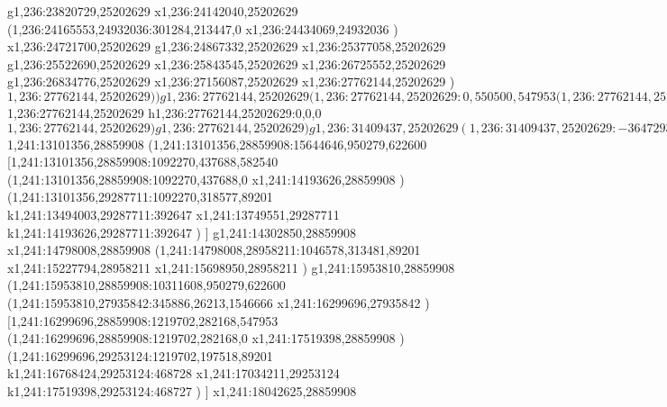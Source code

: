 {g1,236:23820729,25202629
x1,236:24142040,25202629
(1,236:24165553,24932036:301284,213447,0
x1,236:24434069,24932036
)
x1,236:24721700,25202629
g1,236:24867332,25202629
x1,236:25377058,25202629
g1,236:25522690,25202629
x1,236:25843545,25202629
x1,236:26725552,25202629
g1,236:26834776,25202629
x1,236:27156087,25202629
x1,236:27762144,25202629
)
$1,236:27762144,25202629
)
)
g1,236:27762144,25202629
(1,236:27762144,25202629:0,550500,547953
(1,236:27762144,25202629:0,0,0
$1,236:27762144,25202629
h1,236:27762144,25202629:0,0,0
$1,236:27762144,25202629
)
g1,236:27762144,25202629
)
g1,236:31409437,25202629
(1,236:31409437,25202629:-3647293,550500,547953
)
g1,236:27762144,25202629
)
(1,239:10437920,27188733:20971518,455111,0
(1,238:10437920,27188733:0,291271,0
g1,238:10437920,27188733
g1,238:9127198,27188733
g1,238:8799518,27188733
(1,238:8799518,27188733:1310722,291271,0
k1,238:10110240,27188733:1310722
(1,238:10110240,27188733:0,291271,0
k1,238:9782559,27188733:-327681
x1,238:10110240,27188733
)
)
g1,238:10437920,27188733
)
x1,238:11930687,27188733
g1,238:12149140,27188733
x1,238:12622456,27188733
x1,238:12895522,27188733
g1,238:13113975,27188733
x1,238:14169836,27188733
g1,238:14388289,27188733
x1,238:14970833,27188733
g1,238:15189286,27188733
x1,238:17774323,27188733
k1,239:31409438,27188733:13635115
g1,239:31409438,27188733
)
(1,241:10437920,28859908:18308082,950279,622600
g1,241:13101356,28859908
(1,241:13101356,28859908:15644646,950279,622600
g1,241:13101356,28859908
(1,241:13101356,28859908:0,550500,235932
[1,241:13101356,28859908:0,550500,235932
(1,21:13101356,28859908:0,550500,235932
r1,241:13101356,28859908:0,786432,235932
)
]
)
(1,241:13101356,28859908:15644646,950279,622600
$1,241:13101356,28859908
(1,241:13101356,28859908:15644646,950279,622600
[1,241:13101356,28859908:1092270,437688,582540
(1,241:13101356,28859908:1092270,437688,0
x1,241:14193626,28859908
)
(1,241:13101356,29287711:1092270,318577,89201
k1,241:13494003,29287711:392647
x1,241:13749551,29287711
k1,241:14193626,29287711:392647
)
]
g1,241:14302850,28859908
x1,241:14798008,28859908
(1,241:14798008,28958211:1046578,313481,89201
x1,241:15227794,28958211
x1,241:15698950,28958211
)
g1,241:15953810,28859908
(1,241:15953810,28859908:10311608,950279,622600
(1,241:15953810,27935842:345886,26213,1546666
x1,241:16299696,27935842
)
[1,241:16299696,28859908:1219702,282168,547953
(1,241:16299696,28859908:1219702,282168,0
x1,241:17519398,28859908
)
(1,241:16299696,29253124:1219702,197518,89201
k1,241:16768424,29253124:468728
x1,241:17034211,29253124
k1,241:17519398,29253124:468727
)
]
x1,241:18042625,28859908
}
